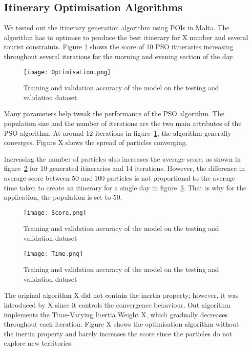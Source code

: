 \subsection{Itinerary Optimisation Algorithms}

We tested out the itinerary generation algorithm using
POIs in Malta. The algorithm has to optimise to
produce the best itinerary for X number and several
tourist constraints. Figure \ref{optimise} shows the score of 10
PSO itineraries increasing throughout several
iterations for the morning and evening section of the
day.

\begin{figure}[h]
\centering
\texttt{[image: Optimisation.png]}
\caption{Training and validation accuracy of the model on the testing and validation dataset}
\label{optimise}
\end{figure}

Many parameters help tweak the performance of the PSO
algorithm. The population size and the number of
iterations are the two main attributes of the PSO
algorithm. At around 12 iterations in figure~\ref{optimise}, the
algorithm generally converges. Figure X shows the
spread of particles converging. 


Increasing the number of particles also increases the
average score, as shown in figure~\ref{score} for 10 generated
itineraries and 14 iterations. However, the difference
in average score between 50 and 100 particles is not
proportional to the average time taken to create an
itinerary for a single day in figure~\ref{time}.  That is why
for the application, the population is set to 50. 

\begin{figure}[h]
\centering
\texttt{[image: Score.png]}
\caption{Training and validation accuracy of the model on the testing and validation dataset}
\label{score}
\end{figure}

\begin{figure}[h]
\centering
\texttt{[image: Time.png]}
\caption{Training and validation accuracy of the model on the testing and validation dataset}
\label{time}
\end{figure}

The original algorithm X did not contain the inertia
property; however, it was introduced by X since it
controls the convergence behaviour. Out algorithm
implements the Time-Varying Inertia Weight X, which
gradually decreases throughout each iteration. Figure
X shows the optimisation algorithm without the inertia
property and barely increases the score since the
particles do not explore new territories.
